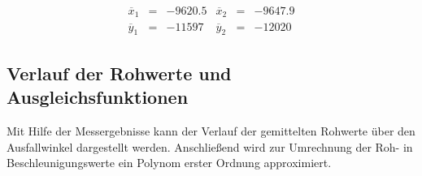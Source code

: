 \documentclass{article}
\begin{document}
\begin{equation}
\begin{array}{lclclcl}
\overline{x}_1 &=& -9620.5 & \overline{x}_2 &=& -9647.9 \\
\overline{y}_1 &=& -11597 & \overline{y}_2 &=& -12020
\end{array}
\end{equation}

\newpage
\subsection{Verlauf der Rohwerte und Ausgleichsfunktionen}
Mit Hilfe der Messergebnisse kann der Verlauf der gemittelten Rohwerte über den Ausfallwinkel dargestellt werden. Anschließend wird zur Umrechnung der Roh- in Beschleunigungswerte ein Polynom erster Ordnung approximiert.
\end{document}
